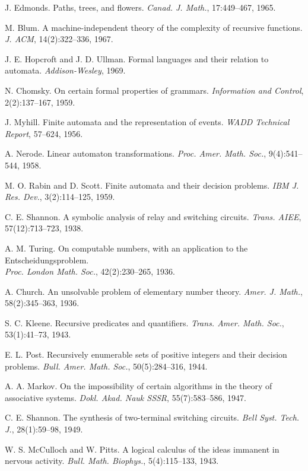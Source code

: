 \documentclass[11pt]{article}
\theoremstyle{plain}
\theoremstyle{definition}
\begin{document}
\begin{thebibliography}{99}
 J. Edmonds. Paths, trees, and flowers. \emph{Canad. J. Math.}, 17:449--467, 1965.

 M. Blum. A machine-independent theory of the complexity of recursive functions. \emph{J. ACM}, 14(2):322--336, 1967.

 J. E. Hopcroft and J. D. Ullman. Formal languages and their relation to automata. \emph{Addison-Wesley}, 1969.

 N. Chomsky. On certain formal properties of grammars. \emph{Information and Control}, 2(2):137--167, 1959.

 J. Myhill. Finite automata and the representation of events. \emph{WADD Technical Report}, 57--624, 1956.

 A. Nerode. Linear automaton transformations. \emph{Proc. Amer. Math. Soc.}, 9(4):541--544, 1958.

 M. O. Rabin and D. Scott. Finite automata and their decision problems. \emph{IBM J. Res. Dev.}, 3(2):114--125, 1959.

 C. E. Shannon. A symbolic analysis of relay and switching circuits. \emph{Trans. AIEE}, 57(12):713--723, 1938.

 A. M. Turing. On computable numbers, with an application to the Entscheidungsproblem. \\
\emph{Proc. London Math. Soc.}, 42(2):230--265, 1936.

 A. Church. An unsolvable problem of elementary number theory. \emph{Amer. J. Math.}, 58(2):345--363, 1936.

 S. C. Kleene. Recursive predicates and quantifiers. \emph{Trans. Amer. Math. Soc.}, 53(1):41--73, 1943.

 E. L. Post. Recursively enumerable sets of positive integers and their decision problems. \emph{Bull. Amer. Math. Soc.}, 50(5):284--316, 1944.

 A. A. Markov. On the impossibility of certain algorithms in the theory of associative systems. \emph{Dokl. Akad. Nauk SSSR}, 55(7):583--586, 1947.

 C. E. Shannon. The synthesis of two-terminal switching circuits. \emph{Bell Syst. Tech. J.}, 28(1):59--98, 1949.

 W. S. McCulloch and W. Pitts. A logical calculus of the ideas immanent in nervous activity. \emph{Bull. Math. Biophys.}, 5(4):115--133, 1943.


\end{thebibliography}
\end{document}
